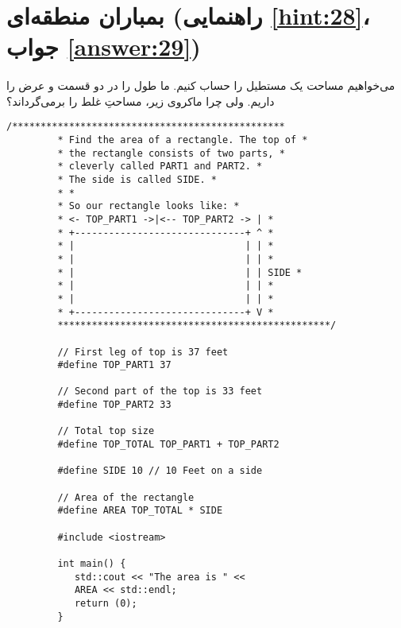 \section[بمباران منطقه‌ای]{بمباران منطقه‌ای \protect{} (راهنمایی \ref{hint:28}، جواب \ref{answer:29})}
\paragraph{}\label{prog:80}
می‌خواهیم مساحت یک مستطیل را حساب کنیم. ما طول را در دو قسمت و عرض را داریم. ولی چرا ماکروی زیر، مساحتِ غلط را برمی‌گرداند؟

\begin{LTR}
    \begin{lstlisting}[style=C++Style]
         /************************************************
         * Find the area of a rectangle. The top of *
         * the rectangle consists of two parts, *
         * cleverly called PART1 and PART2. *
         * The side is called SIDE. *
         * *
         * So our rectangle looks like: *
         * <- TOP_PART1 ->|<-- TOP_PART2 -> | *
         * +------------------------------+ ^ *
         * |                              | | *
         * |                              | | *
         * |                              | | SIDE *
         * |                              | | *
         * |                              | | *
         * +------------------------------+ V *
         ************************************************/

         // First leg of top is 37 feet
         #define TOP_PART1 37

         // Second part of the top is 33 feet
         #define TOP_PART2 33

         // Total top size
         #define TOP_TOTAL TOP_PART1 + TOP_PART2

         #define SIDE 10 // 10 Feet on a side

         // Area of the rectangle
         #define AREA TOP_TOTAL * SIDE

         #include <iostream>

         int main() {
         	std::cout << "The area is " <<
         	AREA << std::endl;
         	return (0);
         }
    \end{lstlisting}
\end{LTR}